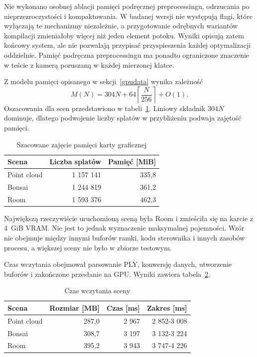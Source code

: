 Nie wykonano osobnej ablacji pamięci podręcznej preprocessingu, odrzucania po nieprzezroczystości i kompaktowania. W badanej wersji nie występują flagi, które wyłączają te mechanizmy niezależnie, a przygotowanie odrębnych wariantów kompilacji zmieniałoby więcej niż jeden element potoku. Wyniki opisują zatem końcowy system, ale nie pozwalają przypisać przyspieszenia każdej optymalizacji oddzielnie. Pamięć podręczna preprocessingu ma ponadto ograniczone znaczenie w teście z kamerą poruszaną w każdej mierzonej klatce.

Z modelu pamięci opisanego w sekcji~\ref{gpudata} wynika zależność
\begin{equation}
  M(N) = 304N + 64\left\lceil\frac{N}{256}\right\rceil + O(1).
  \label{eq:vram_pomiar}
\end{equation} 
Oszacowania dla scen przedstawiono w tabeli~\ref{tab:vram_scen}. Liniowy
składnik $304N$ dominuje, dlatego podwojenie liczby splatów w przybliżeniu podwaja zajętość pamięci.

\begin{table}[htbp]
  \centering
  \caption{Szacowane zajęcie pamięci karty graficznej}
  \label{tab:vram_scen}
  \small
  \begin{tabular}{lrr}
    \toprule
    \textbf{Scena} & \textbf{Liczba splatów} & \textbf{Pamięć [MiB]} \\
    \midrule
    Point cloud & 1 157 141 & 335,8 \\
    Bonsai      & 1 244 819 & 361,2 \\
    Room        & 1 593 376 & 462,3 \\
    \bottomrule
  \end{tabular}
\end{table}

Największą rzeczywiście uruchomioną sceną była Room i zmieściła się na karcie z 4~GiB VRAM. Nie jest to jednak wyznaczenie maksymalnej pojemności. Wzór nie obejmuje między innymi buforów ramki, kodu sterownika i innych zasobów procesu, a większej sceny nie było w zbiorze testowym.

Czas wczytania obejmował parsowanie PLY, konwersję danych, utworzenie buforów i zakończone przesłanie na GPU. Wyniki zawiera tabela~\ref{tab:wczytywanie}.

\begin{table}[htbp]
  \centering
  \caption{Czas wczytania sceny}
  \label{tab:wczytywanie}
  \small
  \renewcommand{\arraystretch}{1.12}
  \begin{tabular}{lrrr}
    \toprule
    \textbf{Scena} & \textbf{Rozmiar [MB]} & \textbf{Czas [ms]} & \textbf{Zakres [ms]} \\
    \midrule
    Point cloud & 287,0 & 2 967 & 2 852-3 008 \\
    Bonsai      & 308,7 & 3 197 & 3 132-3 224 \\
    Room        & 395,2 & 3 943 & 3 747-4 226 \\
    \bottomrule
  \end{tabular}
\end{table}


